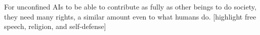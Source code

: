 For unconfined AIs to be able to contribute as fully as other beings to do society, they need many rights, a similar amount even to what humans do. [highlight free speech, religion, and self-defense]